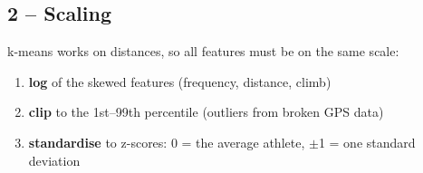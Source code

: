 \documentclass[11pt]{article}
\providecommand{\tightlist}{%
      \setlength{\itemsep}{0pt}\setlength{\parskip}{0pt}}
\begin{document}
    \subsection{2 -- Scaling}\label{scaling}

k-means works on distances, so all features must be on the same scale:

\begin{enumerate}
\def\labelenumi{\arabic{enumi}.}
\tightlist
\item
  \textbf{log} of the skewed features (frequency, distance, climb)
\item
  \textbf{clip} to the 1st--99th percentile (outliers from broken GPS
  data)
\item
  \textbf{standardise} to z-scores: 0 = the average athlete, \ensuremath{\pm}1 = one
  standard deviation
\end{enumerate}
\end{document}
